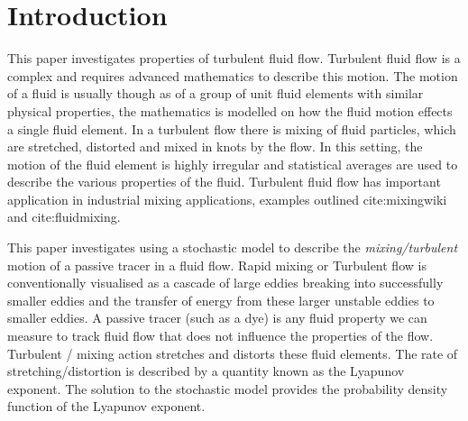 
%

\chapter{Introduction} \label{ch:intro}

  
  This paper investigates properties of turbulent fluid flow. Turbulent fluid flow is a complex and requires advanced mathematics to describe this motion.
  The motion of a fluid is usually though as of a group of unit fluid elements with similar physical properties, the mathematics is modelled on how the fluid motion effects a 
  single fluid element. In a turbulent flow there is mixing of fluid particles, which are stretched, distorted and mixed in knots by the flow. In this setting,
  the motion of the fluid element is highly irregular and statistical averages are used to describe the various properties of the fluid.
  Turbulent fluid flow has important application in industrial mixing applications, examples outlined cite:mixingwiki and cite:fluidmixing.
      
  This paper investigates using a stochastic model to describe the \textit{mixing/turbulent} motion of a passive tracer in a fluid flow. 
  Rapid mixing or Turbulent flow is conventionally visualised as a cascade of large eddies breaking into successfully smaller eddies and the transfer of energy from these larger unstable eddies to smaller eddies.
  A passive tracer (such as a dye) is any fluid property we can measure to track fluid flow that does not influence the properties of the flow.
  Turbulent / mixing action stretches and distorts these fluid elements. The rate of stretching/distortion is described by a quantity known as the Lyapunov exponent. The solution to the stochastic model provides the 
  probability density function of the Lyapunov exponent. 
      
